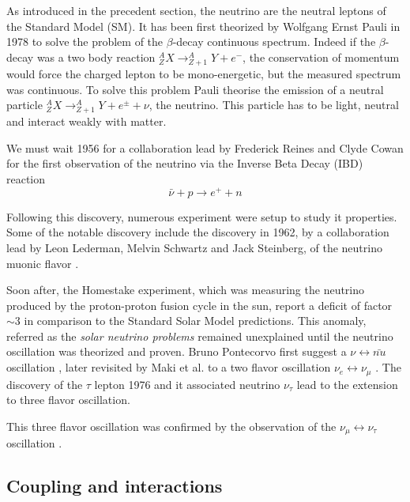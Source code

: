 As introduced in the precedent section, the neutrino are the neutral leptons of the Standard Model (SM). It has been first theorized by Wolfgang Ernst Pauli in 1978 \cite{pauli_dear_1978} to solve the problem of the $\beta$-decay continuous spectrum. Indeed if the $\beta$-decay was a two body reaction $^A_Z X \rightarrow ^A_{Z + 1}Y + e^{-}$, the conservation of momentum would force the charged lepton to be mono-energetic, but the measured spectrum was continuous. To solve this problem Pauli theorise the emission of a neutral particle $^A_Z X \rightarrow ^A_{Z + 1}Y + e^{\pm} + \nu$, the neutrino. This particle has to be light, neutral and interact weakly with matter.

We must wait 1956 for a collaboration lead by Frederick Reines and Clyde Cowan for the first observation of the neutrino \cite{reines_neutrino_1956, cowan_detection_1956} via the Inverse Beta Decay (IBD) reaction
\begin{equation}
  \bar{\nu} + p \rightarrow e^+ + n
\end{equation}

Following this discovery, numerous experiment were setup to study it properties. Some of the notable discovery include the discovery in 1962, by a collaboration lead by Leon Lederman, Melvin Schwartz and Jack Steinberg, of the neutrino muonic flavor \cite{danby_observation_1962}.

Soon after, the Homestake experiment, which was measuring the neutrino produced by the proton-proton fusion cycle in the sun, report a deficit of factor $\sim 3$ \cite{davis_review_1994} in comparison to the Standard Solar Model predictions. This anomaly, referred as the \textit{solar neutrino problems} remained unexplained until the neutrino oscillation was theorized and proven. Bruno Pontecorvo first suggest a $\nu \leftrightarrow \bar{nu}$ oscillation \cite{pontecorvo_mesonium_1957}, later revisited by Maki et al. to a two flavor oscillation $\nu_e \leftrightarrow \nu_\mu$ \cite{maki_remarks_1962}. The discovery of the $\tau$ lepton 1976 \cite{perl_evidence_1975} and it associated neutrino $\nu_\tau$ \cite{kodama_observation_2001} lead to the extension to three flavor oscillation.

This three flavor oscillation was confirmed by the observation of the $\nu_\mu \leftrightarrow \nu_\tau$ oscillation \cite{fukuda_evidence_1998}.

\subsection{Coupling and interactions}


